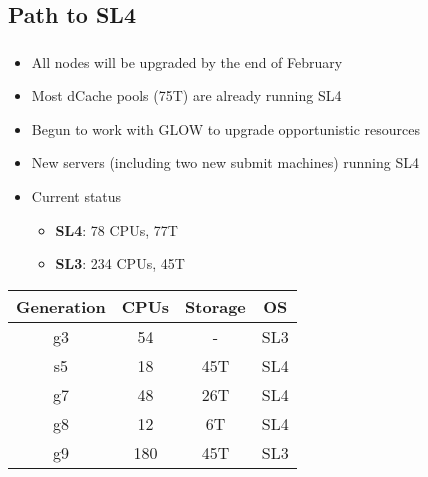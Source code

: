\documentclass{beamer}
\newcommand{\newframe}[1]{\section{#1}
    \frametitle{\sc{#1}}}
\begin{document}
\begin{frame}
\newframe{Path to SL4}

\begin{itemize}
    \item All nodes will be upgraded by the end of February
    \item Most dCache pools (75T) are already running SL4
    \item Begun to work with GLOW to upgrade opportunistic resources
    \item New servers (including two new submit machines) running SL4
    \item Current status
    \begin{itemize}
        \item {\bf SL4}: 78 CPUs, 77T
        \item {\bf SL3}: 234 CPUs, 45T
    \end{itemize}
\end{itemize}

\begin{center}
\begin{tabular}[c]{|c|c|c|c|}
\hline
\bf{Generation} & \bf{CPUs}     & \bf{Storage}  & \bf{OS} \\
\hline
g3              & 54            &  -            & SL3 \\
s5              & 18            & 45T           & SL4 \\
g7              & 48            & 26T           & SL4 \\
g8              & 12            & 6T            & SL4 \\
g9              & 180           & 45T           & SL3 \\
\hline
\end{tabular}
\end{center}

\end{frame}
\end{document}
